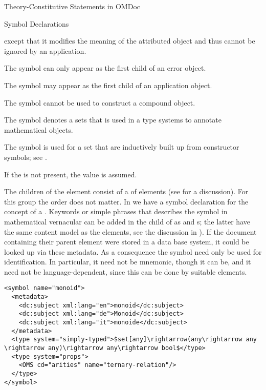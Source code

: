 \begin{omgroup}[short=Mathematical Statements,id=statements]
\begin{omgroup}[id=constitutive-statements]{Theory-Constitutive Statements in OMDoc}
\begin{module}[id=constitutive-statements]
\begin{omgroup}[id=symbol-dec]{Symbol Declarations}
\begin{definition}[id=symbol.def]
\begin{description}
  {} except that it modifies the meaning of the attributed
  {\openmath} object and thus cannot be ignored by an application.
\item[{\attval{error}{role}{symbol}}] The symbol can only appear as the first child of an
  {\openmath} error object.
\item[{\attval{application}{role}{symbol}}] The symbol may appear as the first child of an
  application object.
\item[{\attval{constant}{role}{symbol}}] The symbol cannot be used to construct a compound
  object.
\item[{\attval{type}{role}{symbol}}] The symbol denotes a sets that is used in a type
  systems to annotate mathematical objects.
\item[{\attval{sort}{role}{symbol}}] The symbol is used for a set that are inductively
  built up from constructor symbols; see {}.
\end{description}
If the {} is not present, the value
{} is assumed.

The children of the {} element consist of a
{} of {} elements (see {} for
a discussion). For this group the order does not matter.  In {} we have a
symbol declaration for the concept of a {}.  Keywords or simple phrases
that describes the symbol in mathematical vernacular can be added in the
{} child of {} as {} and
{s}; the latter have the same content model as the
{} elements, see the discussion in {}). If the document
containing their parent {} element were stored in a data base system, it
could be looked up via these metadata. As a consequence the symbol
{} need only be used for identification. In particular, it need
not be mnemonic, though it can be, and it need not be language-dependent, since this can
be done by suitable {} elements.
\end{definition}

\begin{lstlisting}[label=lst:symbol,mathescape,
  caption={An {\omdoc} {\element{symbol}} Declaration},
  index={symbol,type}]
<symbol name="monoid">
  <metadata>
    <dc:subject xml:lang="en">monoid</dc:subject>
    <dc:subject xml:lang="de">Monoid</dc:subject>
    <dc:subject xml:lang="it">monoide</dc:subject>
  </metadata>
  <type system="simply-typed">$set[any]\rightarrow(any\rightarrow any \rightarrow any)\rightarrow any\rightarrow bool$</type>
  <type system="props">
    <OMS cd="arities" name="ternary-relation"/>
  </type>
</symbol>
\end{lstlisting}
\end{omgroup}


\end{module}
\end{omgroup}
\end{omgroup}
